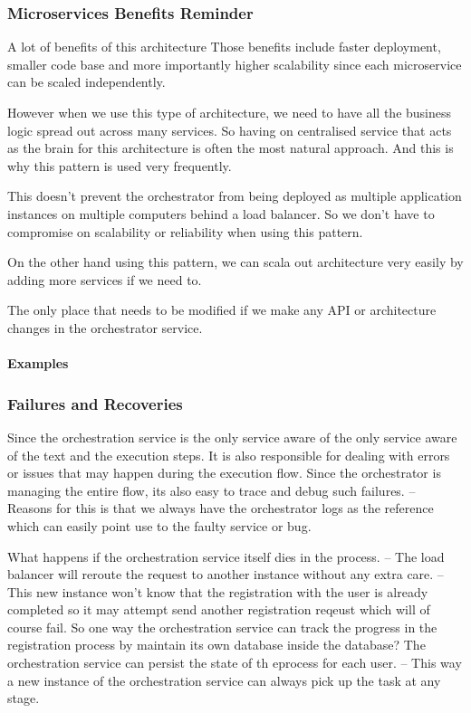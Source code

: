 \documentclass[a4paper, 11pt]{book}
\begin{document}
    \subsubsection{Microservices Benefits Reminder}
    A lot of benefits of this architecture
    Those benefits include faster deployment, smaller code base and more importantly higher scalability since each microservice can be scaled independently.

    However when we use this type of architecture, we need to have all the business logic spread out across many services.
    So having on centralised service that acts as the brain for this architecture is often the most natural approach.
    And this is why this pattern is used very frequently.

    This doesn't prevent the orchestrator from being deployed as multiple application instances on multiple computers behind a load balancer.
    So we don't have to compromise on scalability or reliability when using this pattern.

    On the other hand using this pattern, we can scala out architecture very easily by adding more services if we need to.

    The only place that needs to be modified if we make any API or architecture changes in the orchestrator service.

    \paragraph{Examples}

    \subsubsection{Failures and Recoveries}
    Since the orchestration service is the only service aware of the only service aware of the text and the execution steps.
    It is also responsible for dealing with errors or issues that may happen during the execution flow.
    Since the orchestrator is managing the entire flow, its also easy to trace and debug such failures.
    -- Reasons for this is that we always have the orchestrator logs as the reference which can easily point use to the faulty service or bug.

    What happens if the orchestration service itself dies in the process.
    -- The load balancer will reroute the request to another instance without any extra care.
    -- This new instance won't know that the registration with the user is already completed so it may attempt send another registration reqeust which will of course fail.
    So one way the orchestration service can track the progress in the registration process by maintain its own database inside the database?
    The orchestration service can persist the state of th eprocess for each user.
    -- This way a new instance of the orchestration service can always pick up the task at any stage.
\end{document}
